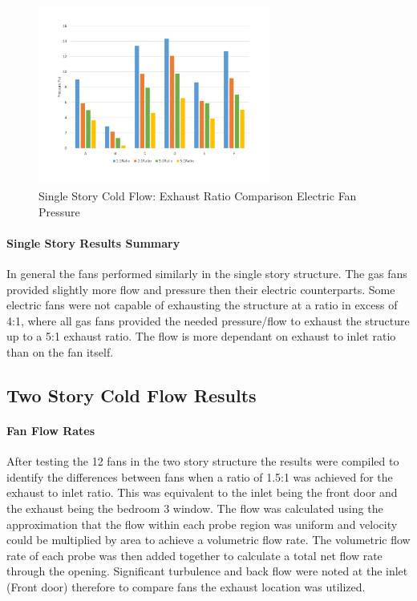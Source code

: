 \documentclass{article}
\begin{document}
	\begin{figure} [H]
		\centering
		\includegraphics[width=3in]{0_Images/ColdFlow/Single_Story/Ratio_Pressure_Dining_Ele.pdf}
		\caption{Single Story Cold Flow: Exhaust Ratio Comparison Electric Fan Pressure}
		\label{fig:Ratio_Pressure_ele}
	\end{figure}

\paragraph{Single Story Results Summary} \mbox{}

In general the fans performed similarly in the single story structure. The gas fans provided slightly more flow and pressure then their electric counterparts. Some electric fans were not capable of exhausting the structure at a ratio in excess of 4:1, where all gas fans provided the needed pressure/flow to exhaust the structure up to a 5:1 exhaust ratio. The flow is more dependant on exhaust to inlet ratio than on the fan itself.

\subsection{Two Story Cold Flow Results}

\paragraph{Fan Flow Rates} \mbox{}

After testing the 12 fans in the two story structure the results were compiled to identify the differences between fans when a ratio of 1.5:1 was achieved for the exhaust to inlet ratio. This was equivalent to the inlet being the front door and the exhaust being the bedroom 3 window.  The flow was calculated using the approximation that the flow within each probe region was uniform and velocity could be multiplied by area to achieve a volumetric flow rate. The volumetric flow rate of each probe was then added together to calculate a total net flow rate through the opening. Significant turbulence and back flow were noted at the inlet (Front door) therefore to compare fans the exhaust location was utilized. 
\end{document}
